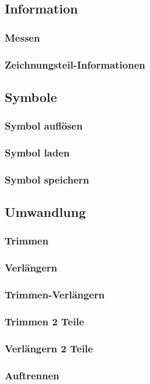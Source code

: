 \documentclass[a4paper]{book}
\begin{document}
		\subsection{Information}
			\subsubsection{Messen} 
			\subsubsection{Zeichnungsteil-Informationen} 
		\subsection{Symbole}
			\subsubsection{Symbol auflösen}
			\subsubsection{Symbol laden} 
			\subsubsection{Symbol speichern} 
		\subsection{Umwandlung}		
			\subsubsection{Trimmen} 
			\subsubsection{Verlängern} 
			\subsubsection{Trimmen-Verlängern} 
			\subsubsection{Trimmen 2 Teile} 
			\subsubsection{Verlängern 2 Teile} 
			\subsubsection{Auftrennen} 
\end{document}
